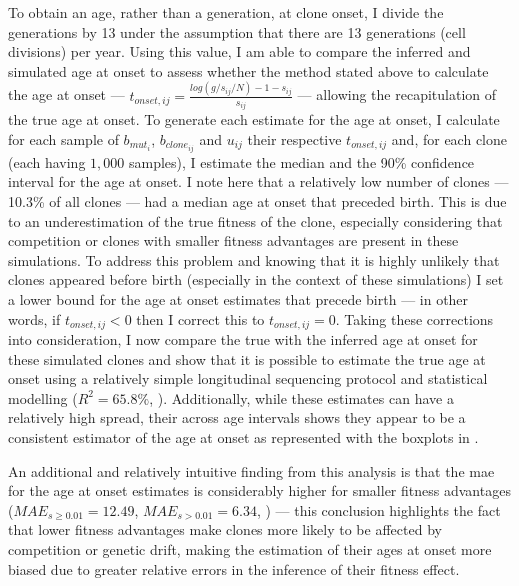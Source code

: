 To obtain an age, rather than a generation, at clone onset, I divide the generations by 13 under the assumption that there are 13 generations (cell divisions) per year. Using this value, I am able to compare the inferred and simulated age at onset to assess whether the method stated above to calculate the age at onset --- $t_{onset,ij} = \frac{log(g/s_{ij}/N)-1-s_{ij}}{s_{ij}}$ --- allowing the recapitulation of the true age at onset. To generate each estimate for the age at onset, I calculate for each sample of $b_{mut_i}$, $b_{clone_{ij}}$ and $u_{ij}$ their respective $t_{onset,ij}$ and, for each clone (each having $1,000$ samples), I estimate the median and the 90\% confidence interval for the age at onset. I note here that a relatively low number of clones --- 10.3\% of all clones --- had a median age at onset that preceded birth. This is due to an underestimation of the true fitness of the clone, especially considering that competition or clones with smaller fitness advantages are present in these simulations. To address this problem and knowing that it is highly unlikely that clones appeared before birth (especially in the context of these simulations) I set a lower bound for the age at onset estimates that precede birth --- in other words, if $t_{onset,ij} < 0$ then I correct this to $t_{onset,ij}=0$. Taking these corrections into consideration, I now compare the true with the inferred age at onset for these simulated clones and show that it is possible to estimate the true age at onset using a relatively simple longitudinal sequencing protocol and statistical modelling ($R^2 = 65.8\%$, ). Additionally, while these estimates can have a relatively high spread, their across age intervals shows they appear to be a consistent estimator of the age at onset as represented with the boxplots in . 

\begin{figure}[!ht]
	\label{fig:age-at-onset-sim}
\end{figure}

An additional and relatively intuitive finding from this analysis is that the \ac{mae} for the age at onset estimates is considerably higher for smaller fitness advantages ($MAE_{s \geq 0.01} = 12.49$, $MAE_{s > 0.01} = 6.34$, ) --- this conclusion highlights the fact that lower fitness advantages make clones more likely to be affected by competition or genetic drift, making the estimation of their ages at onset more biased due to greater relative errors in the inference of their fitness effect. 


